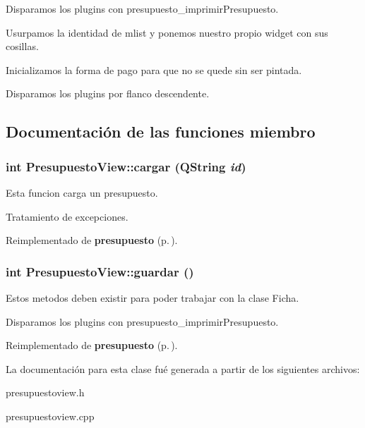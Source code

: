 Disparamos los plugins con presupuesto\_\-imprimir\-Presupuesto.

Usurpamos la identidad de mlist y ponemos nuestro propio widget con sus cosillas.

Inicializamos la forma de pago para que no se quede sin ser pintada.

Disparamos los plugins por flanco descendente. 

\subsection{Documentaci\'{o}n de las funciones miembro}
\subsubsection{\setlength{\rightskip}{0pt plus 5cm}int Presupuesto\-View::cargar (QString {\em id})\hspace{0.3cm}{\tt  [virtual]}}\label{classPresupuestoView_a1}


Esta funcion carga un presupuesto. 

Tratamiento de excepciones. 

Reimplementado de {\bf presupuesto} {\rm (p.\,\pageref{classpresupuesto_a5})}.
\subsubsection{\setlength{\rightskip}{0pt plus 5cm}int Presupuesto\-View::guardar ()\hspace{0.3cm}{\tt  [virtual]}}\label{classPresupuestoView_a2}


Estos metodos deben existir para poder trabajar con la clase Ficha. 

Disparamos los plugins con presupuesto\_\-imprimir\-Presupuesto. 

Reimplementado de {\bf presupuesto} {\rm (p.\,\pageref{classpresupuesto})}.

La documentaci\'{o}n para esta clase fu\'{e} generada a partir de los siguientes archivos:\begin{CompactItemize}
\item 
presupuestoview.h\item 
presupuestoview.cpp\end{CompactItemize}
